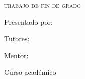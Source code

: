 
\begin{titlepage}
	\AddToShipoutPicture*{\BackgroundPic}

	\begin{addmargin}[2.575cm]{0cm}
		\begin{flushleft}
			\Large
			\hfill\vfil

			\large{\textsf{\miFacultad}}
			\vfill

			{\large\textsc\miGrado} \vfill


			{\large\textsc{trabajo de fin de grado}}

			\begin{flushleft}
				\Huge
				\miTitulo
			\end{flushleft}

			\vfill\vfill\vfill\vfill

			\textsf{\normalsize{Presentado por:}}\\
			{\normalsize\textrm{\miNombre}}
			\bigskip

			\textsf{\normalsize{Tutores:}}\\
			{\normalsize\rmfamily\miTutor}

			\textsf{\normalsize{Mentor:}}\\
			{\normalsize\rmfamily\miMentor}

			\bigskip
			\textsf{\normalsize{Curso académico \miCurso}}
		\end{flushleft}
	\end{addmargin}

\end{titlepage}
\cleardoublepage
\endinput
